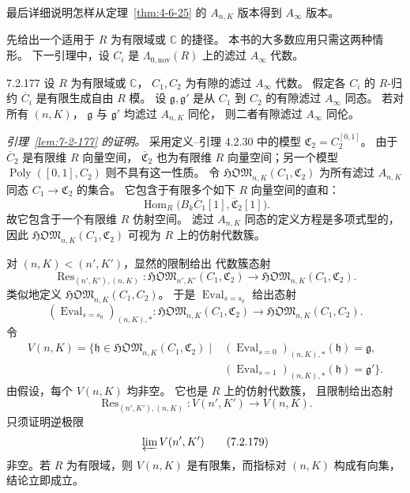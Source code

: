 最后详细说明怎样从定理~\ref{thm:4-6-25}
的 $A_{n,K}$ 版本得到 $A_\infty$ 版本。

先给出一个适用于 $R$ 为有限域或 $\mathbb C$ 的捷径。
本书的大多数应用只需这两种情形。
下一引理中，设 $C_i$ 是
$\Lambda_{0,\mathrm{nov}}(R)$ 上的滤过
$A_\infty$ 代数。

\begin{lemma}{7.2.177}\label{lem:7-2-177}
设 $R$ 为有限域或 $\mathbb C$，
$C_1,C_2$ 为有隙的滤过 $A_\infty$ 代数。
假定各 $C_i$ 的 $R$-归约 $\overline C_i$
是有限生成自由 $R$ 模。
设 $\mathfrak g,\mathfrak g'$ 是从 $C_1$ 到 $C_2$
的有隙滤过 $A_\infty$ 同态。
若对所有 $(n,K)$，
$\mathfrak g$ 与 $\mathfrak g'$
均滤过 $A_{n,K}$ 同伦，
则二者有隙滤过 $A_\infty$ 同伦。
\end{lemma}

\par\noindent\textit{引理~\ref{lem:7-2-177} 的证明。}
采用定义--引理 4.2.30 中的模型
$\mathfrak C_2=C_2^{[0,1]}$。
由于 $\overline C_2$ 是有限维 $R$ 向量空间，
$\overline{\mathfrak C}_2$ 也为有限维
$R$ 向量空间；另一个模型
$\operatorname{Poly}([0,1],C_2)$
则不具有这一性质。
令 $\mathfrak{HOM}_{n,K}(C_1,\mathfrak C_2)$
为所有滤过 $A_{n,K}$ 同态
$C_1\to\mathfrak C_2$ 的集合。
它包含于有限多个如下 $R$ 向量空间的直和：
\[
\operatorname{Hom}_R
\bigl(B_k\overline C_1[1],
\overline{\mathfrak C}_2[1]\bigr).
\]
故它包含于一个有限维 $R$ 仿射空间。
滤过 $A_{n,K}$ 同态的定义方程是多项式型的，
因此
$\mathfrak{HOM}_{n,K}(C_1,\mathfrak C_2)$
可视为 $R$ 上的仿射代数簇。

对 $(n,K)<(n',K')$，显然的限制给出
代数簇态射
\[
\operatorname{Res}_{(n',K'),(n,K)}\colon
\mathfrak{HOM}_{n',K'}(C_1,\mathfrak C_2)
\longrightarrow
\mathfrak{HOM}_{n,K}(C_1,\mathfrak C_2).
\]
类似地定义 $\mathfrak{HOM}_{n,K}(C_1,C_2)$。
于是 $\operatorname{Eval}_{s=s_0}$ 给出态射
\[
(\operatorname{Eval}_{s=s_0})_{(n,K),*}\colon
\mathfrak{HOM}_{n,K}(C_1,\mathfrak C_2)
\longrightarrow
\mathfrak{HOM}_{n,K}(C_1,C_2).
\]
令
\begin{equation}
\begin{aligned}
V(n,K)=\bigl\{\mathfrak h\in
\mathfrak{HOM}_{n,K}(C_1,\mathfrak C_2)
\mid{}&
(\operatorname{Eval}_{s=0})_{(n,K),*}(\mathfrak h)
=\mathfrak g,\\
&
(\operatorname{Eval}_{s=1})_{(n,K),*}(\mathfrak h)
=\mathfrak g'\bigr\}.
\end{aligned}
\tag{7.2.178}\label{eq:7-2-178}
\end{equation}
由假设，每个 $V(n,K)$ 均非空。
它也是 $R$ 上的仿射代数簇，
且限制给出态射
\[
\operatorname{Res}_{(n',K'),(n,K)}\colon
V(n',K')\longrightarrow V(n,K).
\]
只须证明逆极限
\begin{equation}
\varprojlim V(n',K')
\tag{7.2.179}\label{eq:7-2-179}
\end{equation}
非空。若 $R$ 为有限域，则 $V(n,K)$
是有限集，而指标对 $(n,K)$ 构成有向集，
结论立即成立。

